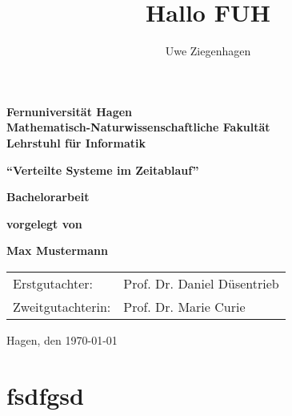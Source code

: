 \documentclass[12pt,ngerman,parskip=half]{scrbook}
\title{Hallo FUH}
\author{Uwe Ziegenhagen}
\begin{document}
\begin{titlepage}
{\large\bfseries Fernuniversität Hagen \\
Mathematisch-Naturwissenschaftliche Fakultät \\
Lehrstuhl für Informatik}

\vspace*{5cm}
\begin{center}
{\LARGE\bfseries\enquote{Verteilte Systeme im Zeitablauf}}
\end{center}

\vspace*{1cm}
\begin{center}
{\Large\bfseries Bachelorarbeit}
\end{center}


\begin{center}
{\large\bfseries  vorgelegt von }
\end{center}

\begin{center}
{\Large\bfseries Max Mustermann}
\end{center}


\vfill
\begin{tabular}{ll}
Erstgutachter: & Prof. Dr. Daniel Düsentrieb \\
Zweitgutachterin: & Prof. Dr. Marie Curie \\
\end{tabular}

\hfill Hagen, den \today
\end{titlepage}



\tableofcontents

\listoffigures

\chapter{fsdfgsd}








\end{document}
